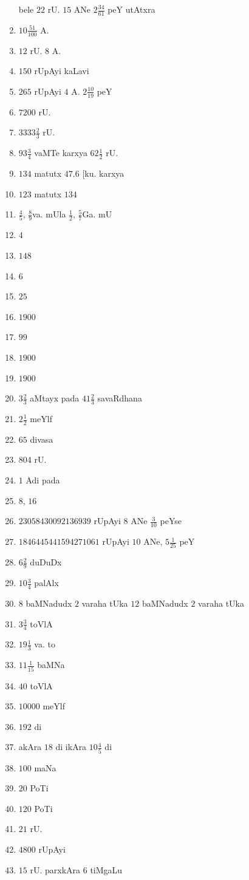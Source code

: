 \begin{multicols}{2}
\begin{enumerate}[$(1)$]
      bele $22$ rU. $15$ ANe $2\frac{34}{61}$ peY utAtxra
\item $10 \frac{51}{100}$ A. 
\item $12$ rU. $8$ A.
\item $150$ rUpAyi kaLavi
\item $265$ rUpAyi $4$ A. $2 \frac{10}{19}$ peY
\item $7200$ rU. 
\item $3333\frac{2}{3}$ rU.
\item $93 \frac{3}{4}$ vaMTe karxya $62 \frac{1}{2}$ rU.
\item $134$ matutx $47.6$ [ku. karxya
\item $123$ matutx $134$
\item $\frac{4}{5}$, $\frac{8}{9}$va. mUla $\frac{1}{2}$,
$\frac{5}{7}$Ga. mU
\item $4$
\item $148$
\item $6$
\item $25$
\item $1900$
\item $99$
\item $1900$
\item $1900$
\item $3\frac{2}{3}$ aMtayx pada $41\frac{2}{3}$ savaRdhana
\item $2\frac{1}{2}$ meYlf 
\item $65$ divasa
\item $804$ rU.
\item $1$ Adi pada
\item $8$, $16$
\item $23058430092136939$ rUpAyi $8$ ANe $\frac{3}{10}$ peYse 
\item $1846445441594271061$ rUpAyi $10$ ANe, $5\frac{1}{25}$ peY
\item $6 \frac{2}{9}$ duDuDx
\item $10\frac{3}{4}$ palAlx
\item $8$ baMNadudx $2$ varaha tUka $12$ baMNadudx $2$ varaha tUka
\item $3\frac{3}{4}$ toVlA 
\item $19 \frac{1}{3}$ va. to
\item $11\frac{1}{15}$ baMNa
\item $40$ toVlA
\item $10000$ meYlf 
\item $192$ di
\item akAra $18$ di ikAra $10 \frac{4}{5}$ di
\item $100$ maNa 
\item $20$ PoTi
\item $120$ PoTi
\item $21$ rU.
\item $4800$ rUpAyi
\item $15$ rU. parxkAra $6$ tiMgaLu 


\end{enumerate}
\end{multicols}
